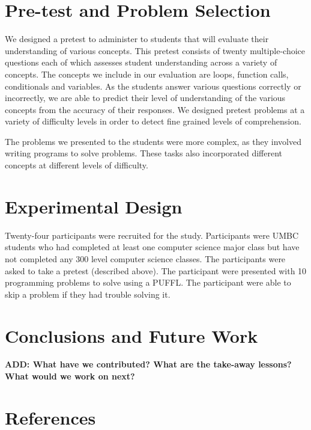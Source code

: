 \documentclass[twocolumn]{article}
\newcommand{\fix}[1]{{\bf #1}}
\begin{document}
\section{Pre-test and Problem Selection}
\label{sec:prob-selection}

We designed a pretest to administer to students that will evaluate their understanding of various concepts.  This pretest consists of twenty multiple-choice questions each of which assesses student understanding across a variety of concepts.  The concepts we include in our evaluation are loops, function calls, conditionals and variables.  As the students answer various questions correctly or incorrectly, we are able to predict their level of understanding of the various concepts from the accuracy of their responses.  We designed pretest problems at a variety of difficulty levels in order to detect fine grained levels of comprehension.

The problems we presented to the students were more complex, as they involved writing programs to solve problems.  These tasks also incorporated different concepts at different levels of difficulty.  

\section{Experimental Design}
\label{sec:exper-design}
 
Twenty-four participants were recruited for the study. Participants were UMBC students who had completed at least one computer science major class but have not completed any 300 level computer science classes. 
The participants were asked to take a pretest (described above). The participant were presented with 10 programming problems to solve using a PUFFL. The participant  were able to skip a problem if they had trouble solving it.



\section{Conclusions and Future Work}
\label{conclusions}

\fix{ADD:  What have we contributed?  What are the take-away lessons?
  What would we work on next?}
  
\section*{References}
\end{document}
